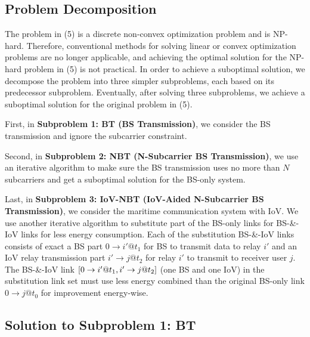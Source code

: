 \documentclass[conference]{IEEEtran}
\begin{document}

\subsection{Problem Decomposition}

The problem in (5) is a discrete non-convex optimization problem and is NP-hard. Therefore, conventional methods for solving linear or convex optimization problems are no longer applicable, and achieving the optimal solution for the NP-hard problem in (5) is not practical. 
In order to achieve a suboptimal solution, we decompose the problem into three simpler subproblems, each based on its predecessor subproblem. Eventually, after solving three subproblems, we achieve a suboptimal solution for the original problem in (5).

First, in \textbf{Subproblem 1: BT (BS Transmission)}, we consider the BS transmission and ignore the subcarrier constraint. 

Second, in \textbf{Subproblem 2: NBT (N-Subcarrier BS Transmission)}, we use an iterative algorithm to make sure the BS transmission uses no more than $N$ subcarriers and get a suboptimal solution for the BS-only system. 

Last, in \textbf{Subproblem 3: IoV-NBT (IoV-Aided N-Subcarrier BS Transmission)}, we consider the maritime communication system with IoV. We use another iterative algorithm to substitute part of the BS-only links for BS-\&-IoV links for less energy consumption. Each of the substitution BS-\&-IoV links consists of exact a BS part $0 \to i'@{t_1}$ for BS to transmit data to relay ${i'}$ and an IoV relay transmission part $i' \to j@{t_2}$ for relay ${i'}$ to transmit to receiver user $j$. The BS-\&-IoV link $\left[ {{\rm{0}} \to i'@{t_1},i' \to j@{t_2}} \right]$ (one BS and one IoV) in the substitution link set must use less energy combined than the original BS-only link $0 \to j@{t_0}$ for improvement energy-wise. 

\subsection{Solution to \textbf{Subproblem 1: BT}}
\end{document}
